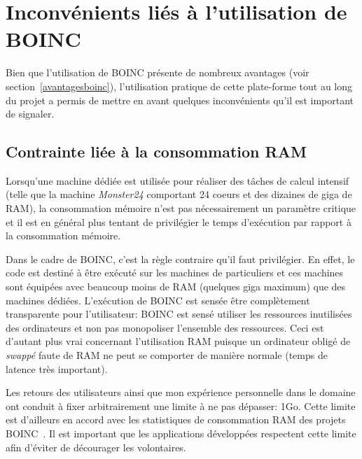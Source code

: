 \documentclass[a4paper, 12pt]{report}
\begin{document}
\section{Inconvénients liés à l'utilisation de \textsc{BOINC}}
Bien que l'utilisation de \textsc{BOINC} présente de nombreux avantages (voir section~\ref{avantagesboinc}), l'utilisation pratique de cette plate-forme tout au long du projet a permis de mettre en avant quelques inconvénients qu'il est important de signaler.

\subsection{Contrainte liée à la consommation RAM}
\label{RAM}
Lorsqu'une machine dédiée est utilisée pour réaliser des tâches de calcul intensif (telle que la machine \textit{Monster24} comportant 24 coeurs et des dizaines de giga de RAM), la consommation mémoire n'est pas nécessairement un paramètre critique et il est en général plus tentant de privilégier le temps d'exécution par rapport à la consommation mémoire. 

Dans le cadre de \textsc{BOINC}, c'est la règle contraire qu'il faut privilégier. En effet, le code est destiné à être exécuté sur les machines de particuliers et ces machines sont équipées avec beaucoup moins de RAM (quelques giga maximum) que des machines dédiées. L'exécution de \textsc{BOINC} est sensée être complètement transparente pour l'utilisateur: \textsc{BOINC} est sensé utiliser les ressources inutilisées des ordinateurs et non pas monopoliser l'ensemble des ressources. Ceci est d'autant plus vrai concernant l'utilisation RAM puisque un ordinateur obligé de \textit{swappé} faute de RAM ne peut se comporter de manière normale (temps de latence très important).

Les retours des utilisateurs ainsi que mon expérience personnelle dans le domaine ont conduit à fixer arbitrairement une limite à ne pas dépasser: 1Go. Cette limite est d'ailleurs en accord avec les statistiques de consommation RAM des projets \textsc{BOINC}~\cite{WUPROP}. Il est important que les applications développées respectent cette limite afin d'éviter de décourager les volontaires. 
\end{document}
